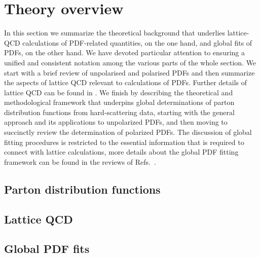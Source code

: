 
\section{Theory overview}
\label{sec:theoryoverview}

In this section we summarize the theoretical background that underlies
lattice-QCD calculations of PDF-related quantities, on the one hand, and 
global fits of PDFs, on the other hand.
%
We have devoted particular attention to ensuring a unified and
consistent notation among the various parts of the whole section.
%
We start with a brief review of unpolarised and polarised PDFs and then 
summarize the aspects of lattice QCD relevant to calculations of PDFs. 
%
Further details of lattice QCD can be found in \cite{???}. 
%
We finish by describing the theoretical and methodological framework that 
underpins global determinations of parton distribution functions from 
hard-scattering data, starting with the general approach and its applications 
to unpolarized PDFs, and then moving to succinctly review the determination of 
polarized PDFs.
%
The discussion of global fitting procedures is restricted to the essential information that is required to connect
with lattice calculations, more details about the
global PDF fitting framework can be found in the reviews of
Refs.~\cite{Ball:2012wy,Forte:2013wc,Rojo:2015acz,Butterworth:2015oua}.

\subsection{Parton distribution functions}
\label{Sec:IntroLQCD}



\subsection{Lattice QCD}
\label{Sec:IntroLQCD}



\subsection{Global PDF fits}





